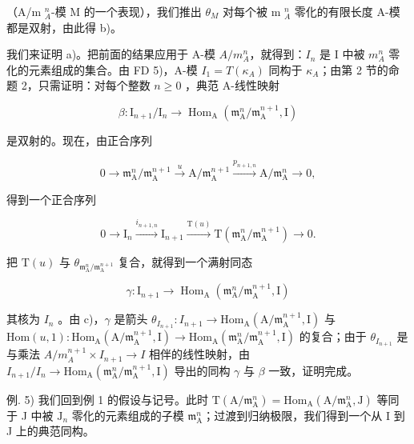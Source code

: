 （A/m \(_{A}^{n}\)-模 M 的一个表现），我们推出 \(\theta_{M}\) 对每个被 m \(_{A}^{n}\) 零化的有限长度 A-模都是双射，由此得 b)。

我们来证明 a)。把前面的结果应用于 A-模 \(A/m_{A}^{n}\)，就得到：\(I_{n}\) 是 I 中被 \(m_{A}^{n}\) 零化的元素组成的集合。由 FD 5)，A-模 \(I_{1} = T(\kappa_{A})\) 同构于 \(\kappa_{A}\)；由第 2 节的命题 2，只需证明：对每个整数 \(n \geqslant 0\) ，典范 A-线性映射

\[
\beta : \mathrm{I} _ {n + 1} / \mathrm{I} _ {n} \longrightarrow \operatorname{Hom} _ {\mathrm{A}} \left(\mathfrak {m} _ {\mathrm{A}} ^ {n} / \mathfrak {m} _ {\mathrm{A}} ^ {n + 1}, \mathrm{I}\right)
\]

是双射的。现在，由正合序列

\[
0 \longrightarrow \mathfrak {m} _ {\mathrm{A}} ^ {n} / \mathfrak {m} _ {\mathrm{A}} ^ {n + 1} \xrightarrow {u} \mathrm{A} / \mathfrak {m} _ {\mathrm{A}} ^ {n + 1} \xrightarrow {p _ {n + 1 , n}} \mathrm{A} / \mathfrak {m} _ {\mathrm{A}} ^ {n} \longrightarrow 0,
\]

得到一个正合序列

\[
0 \longrightarrow \mathrm{I} _ {n} \xrightarrow {i _ {n + 1 , n}} \mathrm{I} _ {n + 1} \xrightarrow {\mathrm{T} (u)} \mathrm{T} (\mathfrak {m} _ {\mathrm{A}} ^ {n} / \mathfrak {m} _ {\mathrm{A}} ^ {n + 1}) \longrightarrow 0.
\]

把 \(\mathrm{T}(u)\) 与 \(\theta_{\mathfrak{m}_{\mathrm{A}}^{n} / \mathfrak{m}_{\mathrm{A}}^{n + 1}}\) 复合，就得到一个满射同态

\[
\gamma : \mathrm{I} _ {n + 1} \longrightarrow \operatorname{Hom} _ {\mathrm{A}} (\mathfrak {m} _ {\mathrm{A}} ^ {n} / \mathfrak {m} _ {\mathrm{A}} ^ {n + 1}, \mathrm{I})
\]

其核为 \(I_{n}\) 。由 c)，\(\gamma\) 是箭头 \(\theta_{I_{n+1}}: I_{n+1} \to \mathrm{Hom}_{\mathrm{A}}(\mathrm{A}/\mathfrak{m}_{\mathrm{A}}^{n+1}, \mathrm{I})\) 与 \(\mathrm{Hom}(u,1): \mathrm{Hom}_{\mathrm{A}}(\mathrm{A}/\mathfrak{m}_{\mathrm{A}}^{n+1}, \mathrm{I}) \longrightarrow \mathrm{Hom}_{\mathrm{A}}(\mathfrak{m}_{\mathrm{A}}^{n}/\mathfrak{m}_{\mathrm{A}}^{n+1}, \mathrm{I})\) 的复合；由于 \(\theta_{I_{n+1}}\) 是与乘法 \(A/m_{A}^{n+1} \times I_{n+1} \longrightarrow I\) 相伴的线性映射，由 \(I_{n+1}/I_{n} \longrightarrow \mathrm{Hom}_{\mathrm{A}}(\mathfrak{m}_{\mathrm{A}}^{n}/\mathfrak{m}_{\mathrm{A}}^{n+1}, \mathrm{I})\) 导出的同构 \(\gamma\) 与 \(\beta\) 一致，证明完成。

例. 5) 我们回到例 1 的假设与记号。此时 \(\mathrm{T}(\mathrm{A} / \mathfrak{m}_{\mathrm{A}}^{n}) = \mathrm{Hom}_{\mathrm{A}}(\mathrm{A} / \mathfrak{m}_{\mathrm{A}}^{n},\mathrm{J})\) 等同于 J 中被 \(\mathrm{J}_n\) 零化的元素组成的子模 \(\mathfrak{m}_{\mathrm{A}}^{n}\)；过渡到归纳极限，我们得到一个从 I 到 J 上的典范同构。

